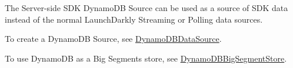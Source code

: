 \label{index_md_docs_doc}%
%
 The Server-\/side SDK Dynamo\+DB Source can be used as a source of SDK data instead of the normal Launch\+Darkly Streaming or Polling data sources.

To create a Dynamo\+DB Source, see \mbox{\hyperlink{classlaunchdarkly_1_1server__side_1_1integrations_1_1DynamoDBDataSource}{Dynamo\+DBData\+Source}}.

To use Dynamo\+DB as a Big Segments store, see \mbox{\hyperlink{classlaunchdarkly_1_1server__side_1_1integrations_1_1DynamoDBBigSegmentStore}{Dynamo\+DBBig\+Segment\+Store}}. 